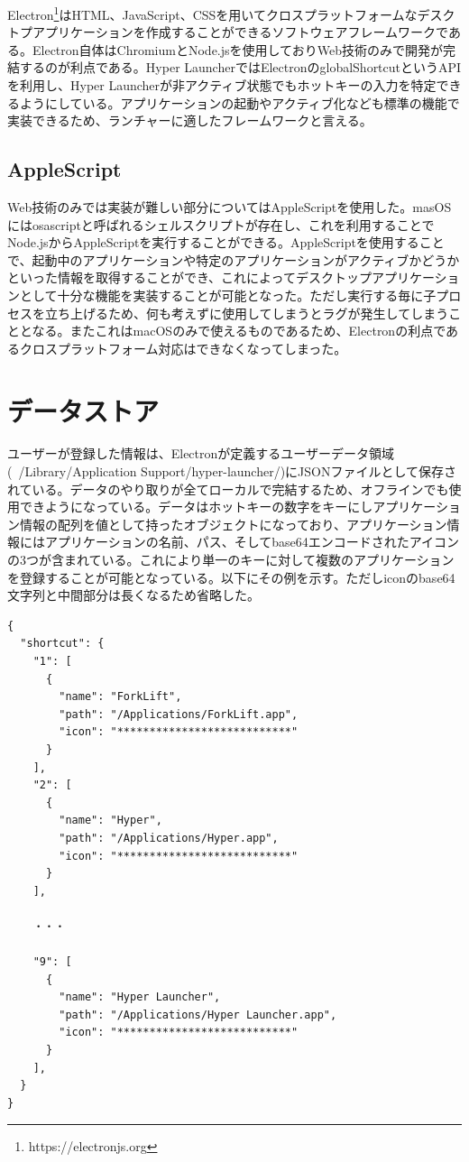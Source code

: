 Electron\footnote{https://electronjs.org}はHTML、JavaScript、CSSを用いてクロスプラットフォームなデスクトプアプリケーションを作成することができるソフトウェアフレームワークである。Electron自体はChromiumとNode.jsを使用しておりWeb技術のみで開発が完結するのが利点である。Hyper LauncherではElectronのglobalShortcutというAPIを利用し、Hyper Launcherが非アクティブ状態でもホットキーの入力を特定できるようにしている。アプリケーションの起動やアクティブ化なども標準の機能で実装できるため、ランチャーに適したフレームワークと言える。

\subsection{AppleScript}

Web技術のみでは実装が難しい部分についてはAppleScriptを使用した。masOSにはosascriptと呼ばれるシェルスクリプトが存在し、これを利用することでNode.jsからAppleScriptを実行することができる。AppleScriptを使用することで、起動中のアプリケーションや特定のアプリケーションがアクティブかどうかといった情報を取得することができ、これによってデスクトップアプリケーションとして十分な機能を実装することが可能となった。ただし実行する毎に子プロセスを立ち上げるため、何も考えずに使用してしまうとラグが発生してしまうこととなる。またこれはmacOSのみで使えるものであるため、Electronの利点であるクロスプラットフォーム対応はできなくなってしまった。

\section{データストア}

ユーザーが登録した情報は、Electronが定義するユーザーデータ領域(~/Library/Application Support/hyper-launcher/)にJSONファイルとして保存されている。データのやり取りが全てローカルで完結するため、オフラインでも使用できようになっている。データはホットキーの数字をキーにしアプリケーション情報の配列を値として持ったオブジェクトになっており、アプリケーション情報にはアプリケーションの名前、パス、そしてbase64エンコードされたアイコンの3つが含まれている。これにより単一のキーに対して複数のアプリケーションを登録することが可能となっている。以下にその例を示す。ただしiconのbase64文字列と中間部分は長くなるため省略した。

\begin{lstlisting}[caption=config.json]
{
  "shortcut": {
    "1": [
      {
        "name": "ForkLift",
        "path": "/Applications/ForkLift.app",
        "icon": "***************************"
      }
    ],
    "2": [
      {
        "name": "Hyper",
        "path": "/Applications/Hyper.app",
        "icon": "***************************"
      }
    ],
    
    ・・・
    
    "9": [
      {
        "name": "Hyper Launcher",
        "path": "/Applications/Hyper Launcher.app",
        "icon": "***************************"
      }
    ],
  }
}
\end{lstlisting}